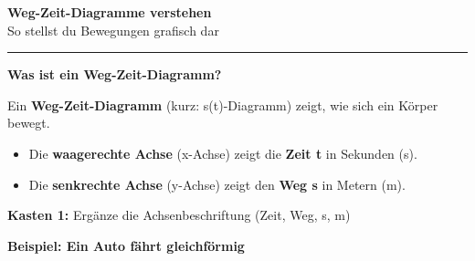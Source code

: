 \documentclass[11pt,a4paper]{article}
\begin{document}
\begin{center}
    {\Large\bfseries\textcolor{physik}{Weg-Zeit-Diagramme verstehen}}\\[0.3em]
    {\small So stellst du Bewegungen grafisch dar}
\end{center}
\vspace{0.5em}
\hrule
\vspace{1em}

\textbf{\textcolor{physik}{Was ist ein Weg-Zeit-Diagramm?}}

\vspace{0.5em}
Ein \textbf{Weg-Zeit-Diagramm} (kurz: s(t)-Diagramm) zeigt, wie sich ein Körper bewegt.

\begin{itemize}[leftmargin=*, itemsep=2pt]
    \item Die \textbf{waagerechte Achse} (x-Achse) zeigt die \textbf{Zeit t} in Sekunden (s).
    \item Die \textbf{senkrechte Achse} (y-Achse) zeigt den \textbf{Weg s} in Metern (m).
\end{itemize}

\vspace{0.5em}
\begin{hefterhinweis}
\textbf{Kasten 1:} Ergänze die Achsenbeschriftung (Zeit, Weg, s, m)
\end{hefterhinweis}

\vspace{0.8em}

\textbf{\textcolor{physik}{Beispiel: Ein Auto fährt gleichförmig}}
\end{document}
